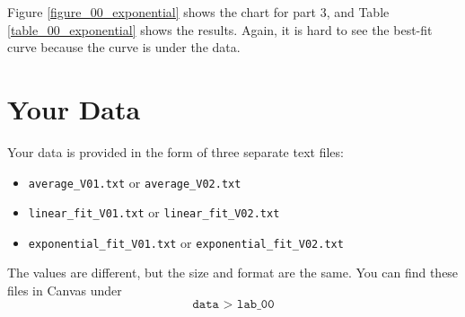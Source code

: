 Figure \ref{figure_00_exponential} shows the chart for part 3, and Table \ref{table_00_exponential} shows the results. Again, it is hard to see the best-fit curve because the curve is under the data.
%
\section{Your Data}
%
Your data is provided in the form of three separate text files:
\begin{itemize}
    \item \texttt{average\_V01.txt} or \texttt{average\_V02.txt}
    \item \texttt{linear\_fit\_V01.txt} or \texttt{linear\_fit\_V02.txt}
    \item \texttt{exponential\_fit\_V01.txt} or \texttt{exponential\_fit\_V02.txt}
\end{itemize}
The values are different, but the size and format are the same. You can find these files in Canvas under
\begin{equation}
    \texttt{data > lab\_00}
\end{equation}
%
%
\newpage
